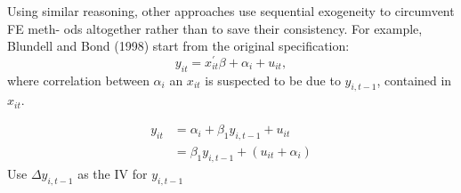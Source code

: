 Using similar reasoning, other approaches use sequential exogeneity to circumvent FE meth-
ods altogether rather than to save their consistency. For example, Blundell and Bond (1998)
start from the original specification:
\[y_{it} = x_{it}^{\prime} \beta + \alpha_i + u_{it}, \]
where correlation between $\alpha_{i}$ an $x_{it}$ is suspected to be due to $y_{i,t-1}$, contained in $x_{it}.$

\begin{definition}
    \begin{align*}
        y_{it} &= \alpha _i + \beta_1 y_{i,t-1} + u_{it} \\
        &= \beta_1 y_{i,t-1} + (u_{it} + \alpha_i) 
    \end{align*}
    Use $\Delta y_{i,t-1}$ as the IV for $y_{i,t-1}$
\end{definition}
